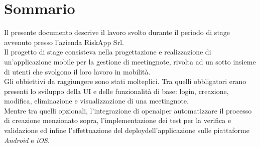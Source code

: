 \cleardoublepage
{}
{}
\begingroup
\let\clearpage\relax
\let\cleardoublepage\relax
\let\cleardoublepage\relax

\chapter*{Sommario}

Il presente documento descrive il lavoro svolto durante il periodo di stage avvenuto presso l'azienda RiskApp Srl. \\

\noindent Il progetto di stage consisteva nella progettazione e realizzazione di un'applicazione mobile per la gestione di \gls{meetingnote}\glsoccur, rivolta ad un sotto insieme di utenti che svolgono il loro lavoro in mobilità. \\


\noindent Gli obbiettivi da raggiungere sono stati molteplici. Tra quelli obbligatori erano presenti lo sviluppo della UI e delle funzionalità di base: login, creazione, modifica, eliminazione e visualizzazione di una \gls{meetingnote}\glsoccur.\\
Mentre tra quelli opzionali, l'integrazione di \gls{openai}\glsoccur per automatizzare il processo di creazione menzionato sopra, l'implementazione dei test per la verifica e validazione ed infine l'effettuazione del \gls{deploy}\glsoccur dell'applicazione sulle piattaforme \emph{Android} e \emph{iOS}.\\




\endgroup

\vfill
